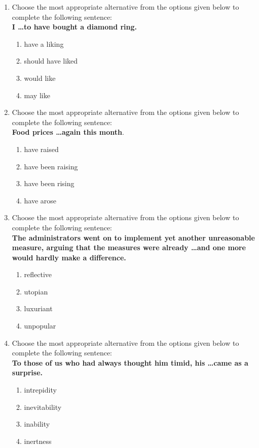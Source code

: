 \documentclass[journal,12pt,twocolumn]{IEEEtran}
\theoremstyle{remark}
\begin{document}
\begin{enumerate}[start=53]
    \item Choose the most appropriate alternative from the options given below to complete the following sentence: \\
   \textbf{ I \dots to have bought a diamond ring.}
    \begin{enumerate}
        \item have a liking
        \item should have liked
        \item would like
        \item may like
    \end{enumerate}

    \item Choose the most appropriate alternative from the options given below to complete the following sentence: \\
    \textbf{Food prices \dots again this month}.
    \begin{enumerate}
        \item have raised
        \item have been raising
        \item have been rising
        \item have arose
    \end{enumerate}

    \item Choose the most appropriate alternative from the options given below to complete the following sentence: \\
    \textbf{The administrators went on to implement yet another unreasonable measure, arguing that the measures were already \dots and one more would hardly make a difference.}
    \begin{enumerate}
        \item reflective
        \item utopian
        \item luxuriant
        \item unpopular
    \end{enumerate}

    \item Choose the most appropriate alternative from the options given below to complete the following sentence: \\
   \textbf{ To those of us who had always thought him timid, his \dots came as a surprise.}
    \begin{enumerate}
        \item intrepidity
        \item inevitability
        \item inability
        \item inertness
    \end{enumerate}


\end{enumerate}
\end{document}
